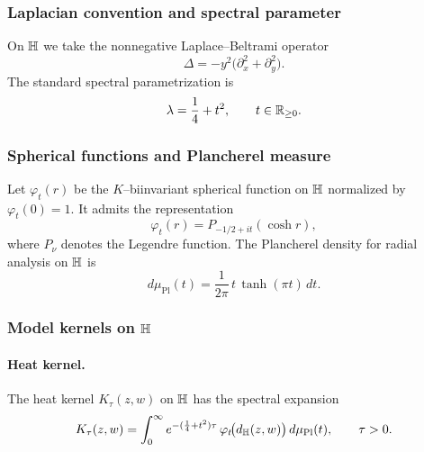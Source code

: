 \subsubsection{Laplacian convention and spectral parameter}

On $\mathbb{H}$ we take the nonnegative Laplace--Beltrami operator
\begin{equation}\label{eq:laplacian}
\Delta=-y^{2}\bigl(\partial_{x}^{2}+\partial_{y}^{2}\bigr).
\end{equation}
The standard spectral parametrization is
\begin{equation}\label{eq:spectral-param}
\lambda=\frac14+t^{2},
\qquad
t\in\mathbb{R}_{\ge 0}.
\end{equation}

\subsubsection{Spherical functions and Plancherel measure}

Let $\varphi_{t}(r)$ be the $K$--biinvariant spherical function on $\mathbb{H}$ normalized by $\varphi_{t}(0)=1$.
It admits the representation
\begin{equation}\label{eq:spherical-function}
\varphi_{t}(r)=P_{-1/2+it}(\cosh r),
\end{equation}
where $P_{\nu}$ denotes the Legendre function.
The Plancherel density for radial analysis on $\mathbb{H}$ is
\begin{equation}\label{eq:plancherel-density}
d\mu_{\mathrm{Pl}}(t)
=
\frac{1}{2\pi}\,t\,\tanh(\pi t)\,dt.
\end{equation}

\subsubsection{Model kernels on $\mathbb{H}$}

\paragraph{Heat kernel.}
The heat kernel $K_{\tau}(z,w)$ on $\mathbb{H}$ has the spectral expansion
\begin{equation}\label{eq:heat-kernel}
K_{\tau}(z,w)
=
\int_{0}^{\infty}
e^{-(\frac14+t^{2})\tau}\,
\varphi_{t}\!\bigl(d_{\mathbb{H}}(z,w)\bigr)\,
d\mu_{\mathrm{Pl}}(t),
\qquad
\tau>0.
\end{equation}

